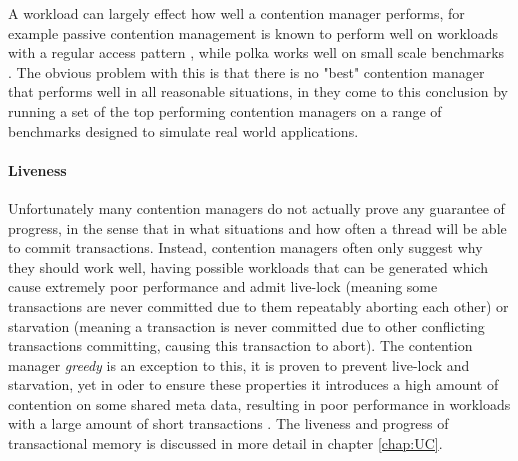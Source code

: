A workload can largely effect how well a contention manager performs, for example passive contention
 management is known to perform well on workloads with a regular access pattern \cite{1504199}, while
 polka works well on small scale benchmarks \cite{DGK09}.
The obvious problem with this is that there is no "best" contention manager that performs well in 
all reasonable situations, in \cite{guerraoui05polymorphic/LPD} they come to this conclusion by 
running a set of the top performing contention managers on a range of benchmarks designed to simulate real world applications.

\paragraph{Liveness}
Unfortunately many contention managers do not actually prove any guarantee of progress,
in the sense that in what situations and how often a thread will be able to commit transactions.
Instead, contention managers often only suggest why they should work well, having possible workloads that can be generated which 
cause extremely poor performance and admit live-lock (meaning some transactions are never committed due to them
repeatably aborting each other) or starvation (meaning a transaction is never committed due to other conflicting transactions committing,
causing this transaction to abort).
The contention manager \emph{greedy} \cite{GHP05} is an exception to this,
it is proven to prevent live-lock and starvation, yet in oder to ensure these properties it
 introduces a high amount of contention on some shared meta data, resulting in poor performance in
 workloads with a large amount of short transactions \cite{DGK09}.
The liveness and progress of transactional memory is discussed in more detail in chapter
\ref{chap:UC}.





















